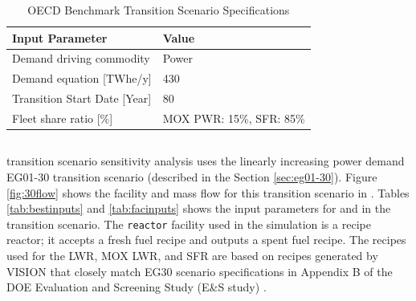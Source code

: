 \begin{table}[H]
    \centering
    \caption{OECD Benchmark Transition Scenario
	Specifications \cite{oecd_nuclear_energy_agency_wpfc_nodate}}
	\label{tab:dymondinputs}
    \scriptsize
    \begin{tabular}{ll}
    \hline
                               \textbf{Input Parameter}            & \textbf{Value}            \\ \hline
    Demand driving commodity   & Power              \\
                               Demand equation {[}TWhe/y{]}   & 430        \\
                               Transition Start Date [Year] & 80\\ 
                               Fleet share ratio [\%] & \gls{MOX} \gls{PWR}: 15\%, \gls{SFR}: 85\%\\ \hline
    \end{tabular}%
    \end{table}

\subsection{\Cyclus}
\Cyclus transition scenario sensitivity analysis uses 
the linearly increasing power demand EG01-30 transition scenario 
(described in the Section \ref{sec:eg01-30}).  
Figure \ref{fig:30flow} shows the facility and mass flow 
for this transition scenario in \Cyclus. 
Tables \ref{tab:bestinputs} and \ref{tab:facinputs}
shows the input parameters for \deploy and 
in the transition scenario. 
The \texttt{reactor} facility used in the \Cyclus simulation 
is a recipe reactor; it accepts a fresh fuel recipe and outputs 
a spent fuel recipe. 
The recipes used for the \gls{LWR}, \gls{MOX} \gls{LWR}, and 
\gls{SFR} are based on recipes generated by VISION 
\cite{chee_arfc/transition-scenarios_2018}
that closely match EG30 scenario specifications in 
Appendix B of the \gls{DOE} Evaluation and Screening Study 
(E\&S study) \cite{wigeland_nuclear_2014}. 

